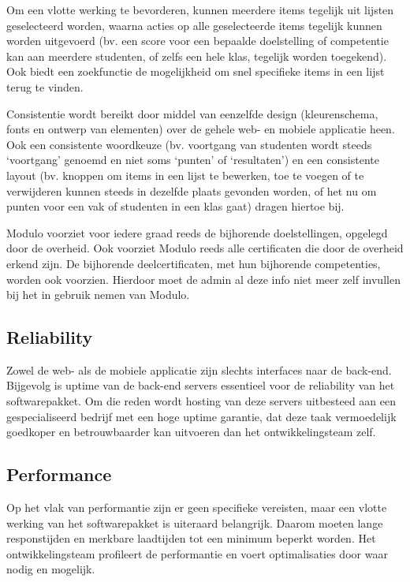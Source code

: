 \documentclass[a4paper]{article}
\begin{document}
Om een vlotte werking te bevorderen, kunnen meerdere items tegelijk uit lijsten geselecteerd worden, waarna acties op alle geselecteerde items tegelijk kunnen worden uitgevoerd (bv. een score voor een bepaalde doelstelling of competentie kan aan meerdere studenten, of zelfs een hele klas, tegelijk worden toegekend). Ook biedt een zoekfunctie de mogelijkheid om snel specifieke items in een lijst terug te vinden.

Consistentie wordt bereikt door middel van eenzelfde design (kleurenschema, fonts en ontwerp van elementen) over de gehele web- en mobiele applicatie heen. Ook een consistente woordkeuze (bv. voortgang van studenten wordt steeds `voortgang' genoemd en niet soms `punten' of `resultaten') en een consistente layout (bv. knoppen om items in een lijst te bewerken, toe te voegen of te verwijderen kunnen steeds in dezelfde plaats gevonden worden, of het nu om punten voor een vak of studenten in een klas gaat) dragen hiertoe bij.

Modulo voorziet voor iedere graad reeds de bijhorende doelstellingen, opgelegd door de overheid. Ook voorziet Modulo reeds alle certificaten die door de overheid erkend zijn. De bijhorende deelcertificaten, met hun bijhorende competenties, worden ook voorzien. Hierdoor moet de admin al deze info niet meer zelf invullen bij het in gebruik nemen van Modulo.


\subsection{Reliability}
Zowel de web- als de mobiele applicatie zijn slechts interfaces naar de back-end. Bijgevolg is uptime van de back-end servers essentieel voor de reliability van het softwarepakket. Om die reden wordt hosting van deze servers uitbesteed aan een gespecialiseerd bedrijf met een hoge uptime garantie, dat deze taak vermoedelijk goedkoper en betrouwbaarder kan uitvoeren dan het ontwikkelingsteam zelf.


\subsection{Performance}
Op het vlak van performantie zijn er geen specifieke vereisten, maar een vlotte werking van het softwarepakket is uiteraard belangrijk. Daarom moeten lange responstijden en merkbare laadtijden tot een minimum beperkt worden. Het ontwikkelingsteam profileert de performantie en voert optimalisaties door waar nodig en mogelijk. 
\end{document}
